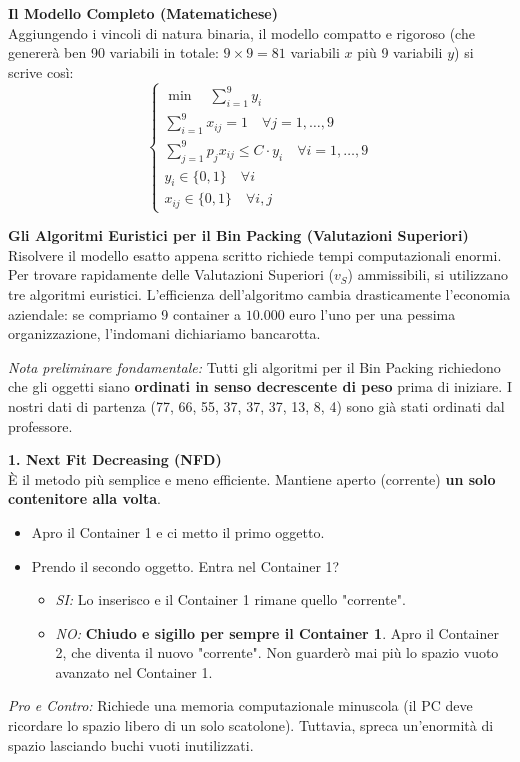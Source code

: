 \documentclass[12pt, a4paper]{article}
\newcommand{\separatore}{\noindent{\color{titlecolor!50}\rule{\textwidth}{0.6pt}}}
\begin{document}
	\textbf{Il Modello Completo (Matematichese)}\\
	Aggiungendo i vincoli di natura binaria, il modello compatto e rigoroso (che genererà ben 90 variabili in totale: $9 \times 9 = 81$ variabili $x$ più 9 variabili $y$) si scrive così:
	\[
	\begin{cases}
		\min \quad \sum_{i=1}^9 y_i \\[6pt]
		\sum_{i=1}^9 x_{ij} = 1 \quad \forall j = 1, \dots, 9 \\[6pt]
		\sum_{j=1}^9 p_j x_{ij} \leq C \cdot y_i \quad \forall i = 1, \dots, 9 \\[6pt]
		y_i \in \{0, 1\} \quad \forall i \\
		x_{ij} \in \{0, 1\} \quad \forall i, j
	\end{cases}
	\]
	
	\vspace{0.6cm}
	\separatore
	\vspace{0.4cm}
	
	\textbf{Gli Algoritmi Euristici per il Bin Packing (Valutazioni Superiori)}\\
	Risolvere il modello esatto appena scritto richiede tempi computazionali enormi. Per trovare rapidamente delle Valutazioni Superiori ($v_S$) ammissibili, si utilizzano tre algoritmi euristici. L'efficienza dell'algoritmo cambia drasticamente l'economia aziendale: se compriamo 9 container a $10.000$ euro l'uno per una pessima organizzazione, l'indomani dichiariamo bancarotta. 
	
	\textit{Nota preliminare fondamentale:} Tutti gli algoritmi per il Bin Packing richiedono che gli oggetti siano \textbf{ordinati in senso decrescente di peso} prima di iniziare. I nostri dati di partenza (77, 66, 55, 37, 37, 37, 13, 8, 4) sono già stati ordinati dal professore.
	
	\vspace{0.3cm}
	\textbf{1. Next Fit Decreasing (NFD)}\\
	È il metodo più semplice e meno efficiente. Mantiene aperto (corrente) \textbf{un solo contenitore alla volta}.
	\begin{itemize}[label=$\circ$, itemsep=1pt]
		\item Apro il Container 1 e ci metto il primo oggetto.
		\item Prendo il secondo oggetto. Entra nel Container 1? 
		\begin{itemize}[label=-]
			\item \textit{SI:} Lo inserisco e il Container 1 rimane quello "corrente".
			\item \textit{NO:} \textbf{Chiudo e sigillo per sempre il Container 1}. Apro il Container 2, che diventa il nuovo "corrente". Non guarderò mai più lo spazio vuoto avanzato nel Container 1.
		\end{itemize}
	\end{itemize}
	\textit{Pro e Contro:} Richiede una memoria computazionale minuscola (il PC deve ricordare lo spazio libero di un solo scatolone). Tuttavia, spreca un'enormità di spazio lasciando buchi vuoti inutilizzati.
	
\end{document}
